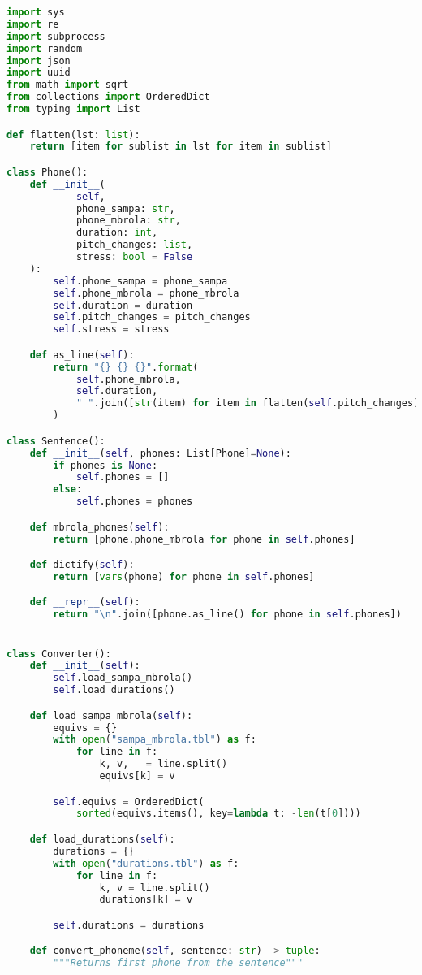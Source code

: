 \begin{lstlisting}[caption=Conversor eSpeakNG-MBROLA, label=conversao, language=Python]
import sys
import re
import subprocess
import random
import json
import uuid
from math import sqrt
from collections import OrderedDict
from typing import List

def flatten(lst: list):
    return [item for sublist in lst for item in sublist]

class Phone():
    def __init__(
            self,
            phone_sampa: str,
            phone_mbrola: str,
            duration: int,
            pitch_changes: list,
            stress: bool = False
    ):
        self.phone_sampa = phone_sampa
        self.phone_mbrola = phone_mbrola
        self.duration = duration
        self.pitch_changes = pitch_changes
        self.stress = stress

    def as_line(self):
        return "{} {} {}".format(
            self.phone_mbrola,
            self.duration,
            " ".join([str(item) for item in flatten(self.pitch_changes)])
        )

class Sentence():
    def __init__(self, phones: List[Phone]=None):
        if phones is None:
            self.phones = []
        else:
            self.phones = phones

    def mbrola_phones(self):
        return [phone.phone_mbrola for phone in self.phones]

    def dictify(self):
        return [vars(phone) for phone in self.phones]

    def __repr__(self):
        return "\n".join([phone.as_line() for phone in self.phones])


class Converter():
    def __init__(self):
        self.load_sampa_mbrola()
        self.load_durations()

    def load_sampa_mbrola(self):
        equivs = {}
        with open("sampa_mbrola.tbl") as f:
            for line in f:
                k, v, _ = line.split()
                equivs[k] = v

        self.equivs = OrderedDict(
            sorted(equivs.items(), key=lambda t: -len(t[0])))

    def load_durations(self):
        durations = {}
        with open("durations.tbl") as f:
            for line in f:
                k, v = line.split()
                durations[k] = v

        self.durations = durations

    def convert_phoneme(self, sentence: str) -> tuple:
        """Returns first phone from the sentence"""


\end{lstlisting}
